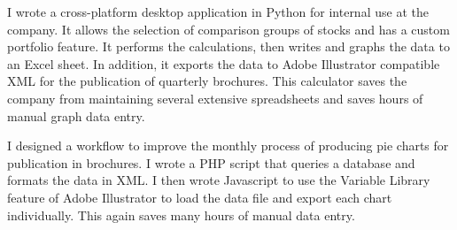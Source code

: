 I wrote a cross-platform desktop application in Python for internal use at the
company. It allows the selection of comparison groups of stocks and has a custom
portfolio feature. It performs the calculations, then writes and graphs the data
to an Excel sheet. In addition, it exports the data to Adobe Illustrator
compatible XML for the publication of quarterly brochures. This calculator saves
the company from maintaining several extensive spreadsheets and saves hours of
manual graph data entry.

I designed a workflow to improve the monthly process of producing pie charts for
publication in brochures. I wrote a PHP script that queries a database and
formats the data in XML. I then wrote Javascript to use the Variable Library
feature of Adobe Illustrator to load the data file and export each chart
individually. This again saves many hours of manual data entry.

